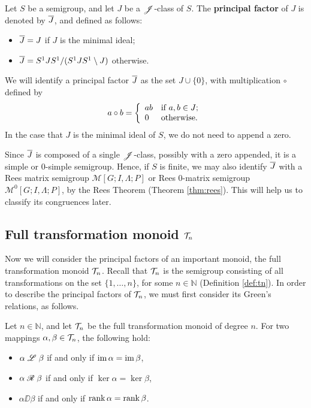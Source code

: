 \begin{definition}
  \label{def:princfact}
  Let $S$ be a semigroup, and let $J$ be a $\mathrel{\mathscr{J}}$-class of $S$.  The
  \textbf{principal factor} of $J$ is denoted by $\overline{J}$, and defined as
  follows:
  \begin{itemize}
  \item $\overline{J} = J$ if $J$ is the minimal ideal;
  \item $\overline{J} = S^1 J S^1 / (S^1 J S^1 \setminus J)$ otherwise.
  \end{itemize}
\end{definition}

We will identify a principal factor $\overline{J}$ as the set $J \cup \{0\}$, with
multiplication $\circ$ defined by
$$a \circ b = \left\{
  \begin{array}{l l}
    ab & \text{if~} a,b \in J; \\
    0 & \text{otherwise}.
  \end{array}\right.$$
In the case that $J$ is the minimal ideal of $S$, we do not need to append a
zero.

Since $\overline{J}$ is composed of a single $\mathrel{\mathscr{J}}$-class, possibly with a zero appended,
it is a simple or 0-simple semigroup.  Hence, if $S$ is finite, we may also
identify $\overline{J}$ with a Rees matrix semigroup $\mathcal{M}[G;I,\Lambda;P]$ or Rees
0-matrix semigroup $\mathcal{M}^0[G;I,\Lambda;P]$, by the Rees Theorem (Theorem
\ref{thm:rees}).  This will help us to classify its congruences later.

\subsection{Full transformation monoid $\mathcal{T}_n$}
\label{sec:princfact-tn}

Now we will consider the principal factors of an important monoid, the full
transformation monoid $\mathcal{T}_n$.  Recall that $\mathcal{T}_n$ is the semigroup consisting of
all transformations on the set $\{1, \dots, n\}$, for some $n \in \mathbb{N}$
(Definition \ref{def:tn}).  In order to describe the principal factors of
$\mathcal{T}_n$, we must first consider its Green's relations, as follows.

\begin{proposition}
  \label{prop:tn-greens}
  Let $n \in \mathbb{N}$, and let $\mathcal{T}_n$ be the full transformation monoid of
  degree $n$.  For two mappings $\alpha, \beta \in \mathcal{T}_n$, the following hold:
  \begin{itemize}
  \item $\alpha \mathrel{\mathscr{L}} \beta$ if and only if $\operatorname{im} \alpha = \operatorname{im} \beta$,
  \item $\alpha \mathrel{\mathscr{R}} \beta$ if and only if $\ker \alpha = \ker \beta$,
  \item $\alpha \DD \beta$ if and only if $\operatorname{rank} \alpha = \operatorname{rank} \beta$.
  \end{itemize}
\end{proposition}

